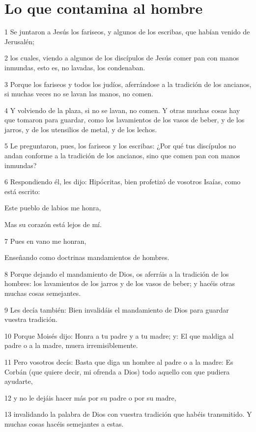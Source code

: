 \section*{Lo que contamina al hombre}

\par 1 Se juntaron a Jesús los fariseos, y algunos de los escribas, que habían venido de Jerusalén;
\par 2 los cuales, viendo a algunos de los discípulos de Jesús comer pan con manos inmundas, esto es, no lavadas, los condenaban.
\par 3 Porque los fariseos y todos los judíos, aferrándose a la tradición de los ancianos, si muchas veces no se lavan las manos, no comen.
\par 4 Y volviendo de la plaza, si no se lavan, no comen. Y otras muchas cosas hay que tomaron para guardar, como los lavamientos de los vasos de beber, y de los jarros, y de los utensilios de metal, y de los lechos.
\par 5 Le preguntaron, pues, los fariseos y los escribas: ¿Por qué tus discípulos no andan conforme a la tradición de los ancianos, sino que comen pan con manos inmundas?
\par 6 Respondiendo él, les dijo: Hipócritas, bien profetizó de vosotros Isaías, como está escrito:
\par Este pueblo de labios me honra,
\par Mas su corazón está lejos de mí.
\par 7 Pues en vano me honran,
\par Enseñando como doctrinas mandamientos de hombres.
\par 8 Porque dejando el mandamiento de Dios, os aferráis a la tradición de los hombres: los lavamientos de los jarros y de los vasos de beber; y hacéis otras muchas cosas semejantes.
\par 9 Les decía también: Bien invalidáis el mandamiento de Dios para guardar vuestra tradición.
\par 10 Porque Moisés dijo: Honra a tu padre y a tu madre; y: El que maldiga al padre o a la madre, muera irremisiblemente.
\par 11 Pero vosotros decís: Basta que diga un hombre al padre o a la madre: Es Corbán (que quiere decir, mi ofrenda a Dios) todo aquello con que pudiera ayudarte,
\par 12 y no le dejáis hacer más por su padre o por su madre,
\par 13 invalidando la palabra de Dios con vuestra tradición que habéis transmitido. Y muchas cosas hacéis semejantes a estas.
